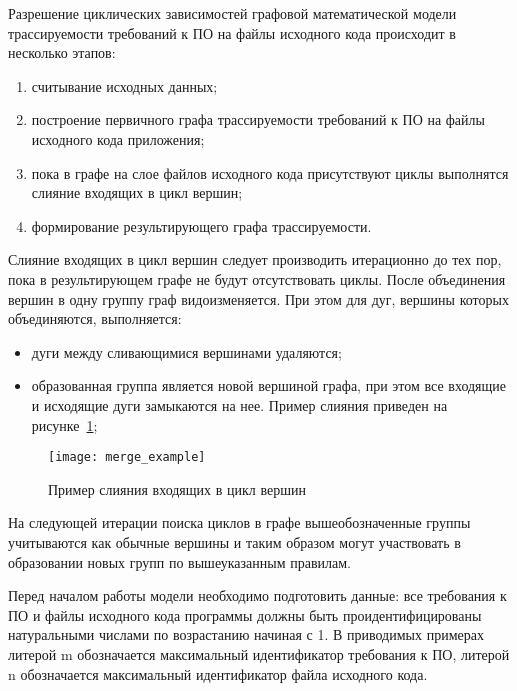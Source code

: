 Разрешение циклических зависимостей графовой математической модели трассируемости требований к ПО на файлы исходного кода происходит в несколько этапов:
\begin{enumerate}
    \item считывание исходных данных;
    \item построение первичного графа трассируемости требований к ПО на файлы исходного кода приложения;
    \item пока в графе на слое файлов исходного кода присутствуют циклы выполнятся слияние входящих в цикл вершин;
    \item формирование результирующего графа трассируемости.
\end{enumerate}

Слияние входящих в цикл вершин следует производить итерационно до тех пор, пока в результирующем графе не будут отсутствовать циклы. После объединения вершин в одну группу граф видоизменяется. При этом для дуг, вершины которых объединяются, выполняется:
\begin{itemize}
    \item дуги между сливающимися вершинами удаляются;
    \item образованная группа является новой вершиной графа, при этом все входящие и исходящие дуги замыкаются на нее. Пример слияния приведен на рисунке~\ref{fig:merge_example};
\end{itemize}

\begin{figure}[H]
    \centering
    \texttt{[image: merge\_example]}
    \caption{Пример слияния входящих в цикл вершин}
    \label{fig:merge_example}
\end{figure}

На следующей итерации поиска циклов в графе вышеобозначенные группы учитываются как обычные вершины и таким образом могут участвовать в образовании новых групп по вышеуказанным правилам.

Перед началом работы модели необходимо подготовить данные: все требования к ПО и файлы исходного кода программы должны быть проидентифицированы натуральными числами по возрастанию начиная с 1. В приводимых примерах литерой m обозначается максимальный идентификатор требования к ПО, литерой n обозначается максимальный идентификатор файла исходного кода.

